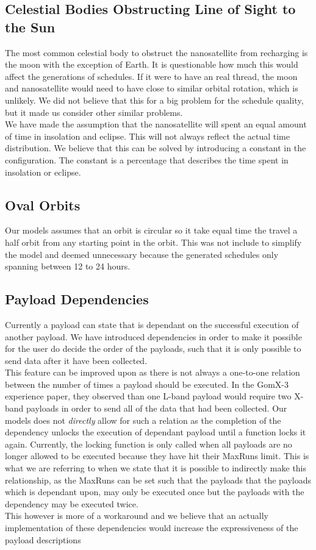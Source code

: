 \subsection*{Celestial Bodies Obstructing Line of Sight to the Sun}
The most common celestial body to obstruct the nanosatellite from recharging is the moon with the exception of Earth.
It is questionable how much this would affect the generations of schedules. If it were to have an real thread, the moon and nanosatellite would need to have close to similar orbital rotation, which is unlikely. We did not believe that this for a big problem for the schedule quality, but it made us consider other similar problems.\\
We have made the assumption that the nanosatellite will spent an equal amount of time in insolation and eclipse. This will not always reflect the actual time distribution. We believe that this can be solved by introducing a constant in the configuration. The constant is a percentage that describes the time spent in insolation or eclipse. 

\subsection*{Oval Orbits}
Our models assumes that an orbit is circular so it take equal time the travel a half orbit from any starting point in the orbit. This was not include to simplify the model and deemed unnecessary because the generated schedules only spanning between 12 to 24 hours. 

\subsection*{Payload Dependencies}
Currently a payload can state that is dependant on the successful execution of another payload. We have introduced dependencies in order to make it possible for the user do decide the order of the payloads, such that it is only possible to send data after it have been collected.\\
This feature can be improved upon as there is not always a one-to-one relation between the number of times a payload should be executed. In the GomX-3 experience paper\cite{gomx3}, they observed than one L-band payload would require two X-band payloads in order to send all of the data that had been collected. Our models does not \textit{directly} allow for such a relation as the completion of the dependency unlocks the execution of dependant payload until a function locks it again. Currently, the locking function is only called when all payloads are no longer allowed to be executed because they have hit their MaxRuns limit. This is what we are referring to when we state that it is possible to indirectly make this relationship, as the MaxRuns can be set such that the payloads that the payloads which is dependant upon, may only be executed once but the payloads with the dependency may be executed twice.\\
This however is more of a workaround and we believe that an actually implementation of these dependencies would increase the expressiveness of the payload descriptions


